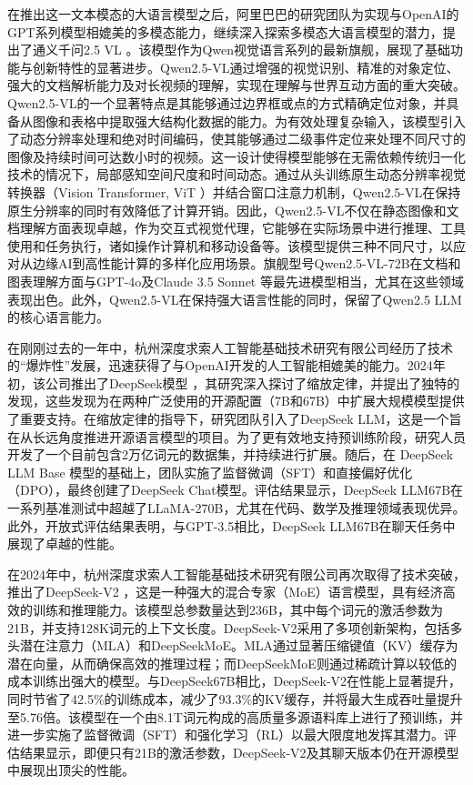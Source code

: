 在推出这一文本模态的大语言模型之后，阿里巴巴的研究团队为实现与OpenAI的GPT系列模型相媲美的多模态能力，继续深入探索多模态大语言模型的潜力，提出了通义千问2.5 VL \cite{bai2025qwen25vltechnicalreport}。该模型作为Qwen视觉语言系列的最新旗舰，展现了基础功能与创新特性的显著进步。Qwen2.5-VL通过增强的视觉识别、精准的对象定位、强大的文档解析能力及对长视频的理解，实现在理解与世界互动方面的重大突破。Qwen2.5-VL的一个显著特点是其能够通过边界框或点的方式精确定位对象，并具备从图像和表格中提取强大结构化数据的能力。为有效处理复杂输入，该模型引入了动态分辨率处理和绝对时间编码，使其能够通过二级事件定位来处理不同尺寸的图像及持续时间可达数小时的视频。这一设计使得模型能够在无需依赖传统归一化技术的情况下，局部感知空间尺度和时间动态。通过从头训练原生动态分辨率视觉转换器（Vision Transformer, ViT \cite{dosovitskiy2021imageworth16x16words}）并结合窗口注意力机制，Qwen2.5-VL在保持原生分辨率的同时有效降低了计算开销。因此，Qwen2.5-VL不仅在静态图像和文档理解方面表现卓越，作为交互式视觉代理，它能够在实际场景中进行推理、工具使用和任务执行，诸如操作计算机和移动设备等。该模型提供三种不同尺寸，以应对从边缘AI到高性能计算的多样化应用场景。旗舰型号Qwen2.5-VL-72B在文档和图表理解方面与GPT-4o及Claude 3.5 Sonnet \cite{AnthropicModelCA}等最先进模型相当，尤其在这些领域表现出色。此外，Qwen2.5-VL在保持强大语言性能的同时，保留了Qwen2.5 LLM的核心语言能力。

在刚刚过去的一年中，杭州深度求索人工智能基础技术研究有限公司经历了技术的“爆炸性”发展，迅速获得了与OpenAI开发的人工智能相媲美的能力。2024年初，该公司推出了DeepSeek模型 \cite{deepseekai2024deepseekllmscalingopensource}，其研究深入探讨了缩放定律，并提出了独特的发现，这些发现为在两种广泛使用的开源配置（7B和67B）中扩展大规模模型提供了重要支持。在缩放定律的指导下，研究团队引入了DeepSeek LLM，这是一个旨在从长远角度推进开源语言模型的项目。为了更有效地支持预训练阶段，研究人员开发了一个目前包含2万亿词元的数据集，并持续进行扩展。随后，在 DeepSeek LLM Base 模型的基础上，团队实施了监督微调（SFT）和直接偏好优化（DPO），最终创建了DeepSeek Chat模型。评估结果显示，DeepSeek LLM67B在一系列基准测试中超越了LLaMA-270B，尤其在代码、数学及推理领域表现优异。此外，开放式评估结果表明，与GPT-3.5相比，DeepSeek LLM67B在聊天任务中展现了卓越的性能。

在2024年中，杭州深度求索人工智能基础技术研究有限公司再次取得了技术突破，推出了DeepSeek-V2 \cite{deepseekai2024deepseekv2strongeconomicalefficient}，这是一种强大的混合专家（MoE）语言模型，具有经济高效的训练和推理能力。该模型总参数量达到236B，其中每个词元的激活参数为21B，并支持128K词元的上下文长度。DeepSeek-V2采用了多项创新架构，包括多头潜在注意力（MLA）和DeepSeekMoE。MLA通过显著压缩键值（KV）缓存为潜在向量，从而确保高效的推理过程；而DeepSeekMoE则通过稀疏计算以较低的成本训练出强大的模型。与DeepSeek67B相比，DeepSeek-V2在性能上显著提升，同时节省了42.5\%的训练成本，减少了93.3\%的KV缓存，并将最大生成吞吐量提升至5.76倍。该模型在一个由8.1T词元构成的高质量多源语料库上进行了预训练，并进一步实施了监督微调（SFT）和强化学习（RL）以最大限度地发挥其潜力。评估结果显示，即便只有21B的激活参数，DeepSeek-V2及其聊天版本仍在开源模型中展现出顶尖的性能。

